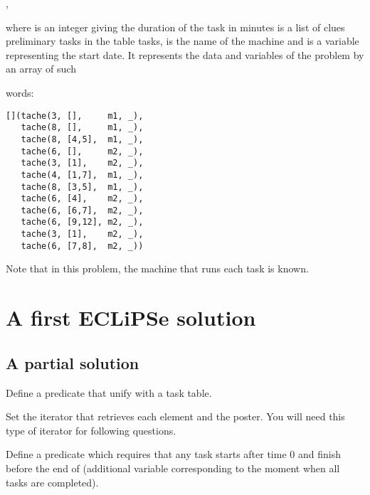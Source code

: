 \begin{center}
    ,
\end{center}
where  is an integer giving the duration of the task in minutes
 is a list of clues preliminary tasks in the table
tasks,
  is the name of the machine and  is a
variable representing the start date.
It represents the data and variables of the problem by an array of such

words:
\begin{center}
\begin{verbatim}
[](tache(3, [],     m1, _),
   tache(8, [],     m1, _),
   tache(8, [4,5],  m1, _),
   tache(6, [],     m2, _),
   tache(3, [1],    m2, _),
   tache(4, [1,7],  m1, _),
   tache(8, [3,5],  m1, _),
   tache(6, [4],    m2, _),
   tache(6, [6,7],  m2, _),
   tache(6, [9,12], m2, _),
   tache(3, [1],    m2, _),
   tache(6, [7,8],  m2, _))
\end{verbatim}
\end{center}

Note that in this problem, the machine that runs each task is known.

\section{A first ECLiPSe solution}
\label{sec:vers-une-solutionOrdo}

\subsection{A partial solution}
\begin{question} \label{TP2_Q1}
Define a predicate  that unify  with a task table.
\end{question}

\begin{question}
  Set the iterator that retrieves each element and
   the poster. You will need this type of iterator for
   following questions.
\end{question}


\begin{question} \label{TP2_Q2}
Define a predicate  which requires that any task  starts after time 0 and
finish before the end of (additional variable corresponding to the moment when all tasks are completed).
\end{question}

